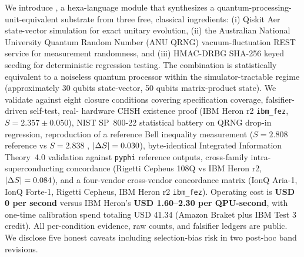 We introduce \qmirror, a hexa-language module that synthesizes a
quantum-processing-unit-equivalent substrate from three free, classical
ingredients: (i) Qiskit Aer state-vector simulation for exact unitary
evolution, (ii) the Australian National University Quantum Random
Number (ANU QRNG) vacuum-fluctuation REST service for measurement
randomness, and (iii) HMAC-DRBG SHA-256 keyed seeding for deterministic
regression testing. The combination is statistically equivalent to a
noiseless quantum processor within the simulator-tractable regime
(approximately 30 qubits state-vector, 50 qubits matrix-product
state). We validate \qmirror{} against eight closure conditions
covering specification coverage, falsifier-driven self-test, real-
hardware CHSH existence proof (IBM Heron r2 \texttt{ibm\_fez},
$S = 2.357 \pm 0.050$), NIST SP~800-22 statistical battery on QRNG
drop-in regression, reproduction of a reference Bell inequality
measurement ($S = 2.808$ reference vs $S = 2.838$ \qmirror,
$\lvert\Delta S\rvert = 0.030$), byte-identical Integrated Information Theory~4.0
\phistar{} validation against \texttt{pyphi} reference outputs,
cross-family intra-superconducting concordance (Rigetti Cepheus 108Q
vs IBM Heron r2, $\lvert\Delta S\rvert = 0.084$), and a four-vendor cross-vendor
concordance matrix (IonQ Aria-1, IonQ Forte-1, Rigetti Cepheus, IBM
Heron r2 \texttt{ibm\_fez}). Operating cost is \textbf{USD 0 per
second} versus IBM Heron's \textbf{USD 1.60--2.30 per QPU-second},
with one-time calibration spend totaling USD 41.34 (Amazon Braket plus
IBM Test 3 credit). All per-condition evidence, raw counts, and
falsifier ledgers are public. We disclose five honest caveats including
selection-bias risk in two post-hoc band revisions.
